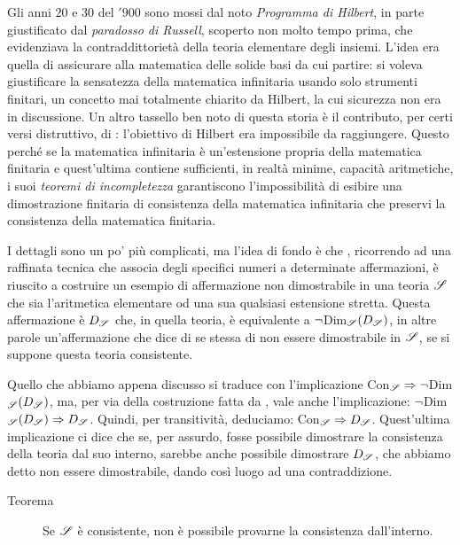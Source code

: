 		Gli anni $20$ e $30$ del $'900$ sono mossi dal noto \emph{Programma di Hilbert}, in parte giustificato dal \emph{paradosso di Russell}, scoperto non molto tempo prima, che evidenziava la contraddittorietà della teoria elementare degli insiemi. L'idea era quella di assicurare alla matematica delle solide basi da cui partire: si voleva giustificare la sensatezza della matematica infinitaria usando solo strumenti finitari, un concetto mai totalmente chiarito da Hilbert, la cui sicurezza non era in discussione.
		Un altro tassello ben noto di questa storia è il contributo, per certi versi distruttivo, di \Godel: l'obiettivo di Hilbert era impossibile da raggiungere. Questo perché se la matematica infinitaria è un'estensione propria della matematica finitaria e quest'ultima contiene sufficienti, in realtà minime, capacità aritmetiche, i suoi \emph{teoremi di incompletezza} garantiscono l'impossibilità di esibire una dimostrazione finitaria di consistenza della matematica infinitaria che preservi la consistenza della matematica finitaria.
		
		I dettagli sono un po' più complicati, ma l'idea di fondo è che \Godel, ricorrendo ad una raffinata tecnica che associa degli specifici numeri a determinate affermazioni, è riuscito a costruire un esempio di affermazione non dimostrabile in una teoria $\mathscr{S}$ che sia l'aritmetica elementare od una sua qualsiasi estensione stretta. Questa affermazione è $D_{\mathscr{S}}$ che, in quella teoria, è equivalente a $\neg$Dim$_{\mathscr{S}}(D_{\mathscr{S}})$, in altre parole un'affermazione che dice di se stessa di non essere dimostrabile in $\mathscr{S}$, se si suppone questa teoria consistente.
		
		Quello che abbiamo appena discusso si traduce con l'implicazione Con$_{\mathscr{S}}\Rightarrow\neg$Dim$_{\mathscr{S}}(D_{\mathscr{S}})$, ma, per via della costruzione fatta da \Godel, vale anche l'implicazione: $\neg$Dim$_{\mathscr{S}}(D_{\mathscr{S}})\Rightarrow D_{\mathscr{S}}$. Quindi, per transitività, deduciamo: Con$_{\mathscr{S}}\Rightarrow D_{\mathscr{S}}$. Quest'ultima implicazione ci dice che se, per assurdo, fosse possibile dimostrare la consistenza della teoria dal suo interno, sarebbe anche possibile dimostrare $D_{\mathscr{S}}$, che abbiamo detto non essere dimostrabile, dando così luogo ad una contraddizione.
		
		\begin{description}
			\item[Teorema] Se $\mathscr{S}$ è consistente, non è possibile provarne la consistenza dall'interno.
		\end{description}
		
